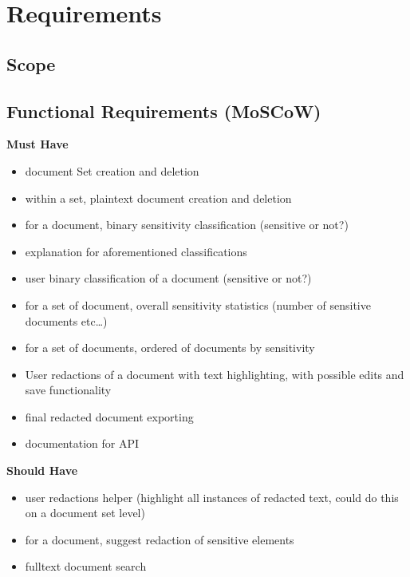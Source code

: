 \documentclass{l4proj}
\begin{document}
\chapter{Requirements}

\section{Scope}

\section{Functional Requirements (MoSCoW)}

\begin{minipage}[t]{.5\linewidth}
    \centerline{\textbf{Must Have}}
    \begin{itemize}
        \item document Set creation and deletion
        \item within a set, plaintext document creation and deletion
        \item for a document, binary sensitivity classification (sensitive or not?)
        \item explanation for aforementioned classifications
        \item user binary classification of a document (sensitive or not?)
        \item for a set of document, overall sensitivity statistics (number of sensitive documents etc…)
        \item for a set of documents, ordered of documents by sensitivity
        \item User redactions of a document with text highlighting, with possible edits and save functionality
        \item final redacted document exporting
        \item documentation for API
    \end{itemize}
\end{minipage}
\hfill
\noindent
\begin{minipage}[t]{.5\linewidth}
    \centerline{\textbf{Should Have}}
    \begin{itemize}
        \item user redactions helper (highlight all instances of redacted text, could do this on a document set level)
        \item for a document, suggest redaction of sensitive elements
        \item fulltext document search
    \end{itemize}
\end{minipage}
\end{document}
